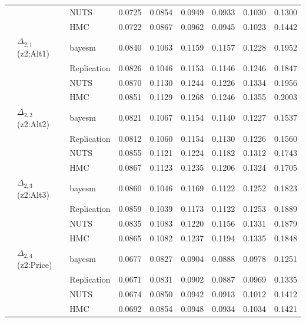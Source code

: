 \begin{longtable}{cllcccccc}
 &  & NUTS & 0.0725 & 0.0854 & 0.0949 & 0.0933 & 0.1030 & 0.1300 \\
 &  & HMC & 0.0722 & 0.0867 & 0.0962 & 0.0945 & 0.1023 & 0.1442 \\
 & $\Delta_{2,1}$ (z2:Alt1) & bayesm & 0.0840 & 0.1063 & 0.1159 & 0.1157 & 0.1228 & 0.1952 \\
 &  & Replication & 0.0826 & 0.1046 & 0.1153 & 0.1146 & 0.1246 & 0.1847 \\
 &  & NUTS & 0.0870 & 0.1130 & 0.1244 & 0.1226 & 0.1334 & 0.1956 \\
 &  & HMC & 0.0851 & 0.1129 & 0.1268 & 0.1246 & 0.1355 & 0.2003 \\
 & $\Delta_{2,2}$ (z2:Alt2) & bayesm & 0.0821 & 0.1067 & 0.1154 & 0.1140 & 0.1227 & 0.1537 \\
 &  & Replication & 0.0812 & 0.1060 & 0.1154 & 0.1130 & 0.1226 & 0.1560 \\
 &  & NUTS & 0.0855 & 0.1121 & 0.1224 & 0.1182 & 0.1312 & 0.1743 \\
 &  & HMC & 0.0867 & 0.1123 & 0.1235 & 0.1206 & 0.1324 & 0.1705 \\
 & $\Delta_{2,3}$ (z2:Alt3) & bayesm & 0.0860 & 0.1046 & 0.1169 & 0.1122 & 0.1252 & 0.1823 \\
 &  & Replication & 0.0859 & 0.1039 & 0.1173 & 0.1122 & 0.1253 & 0.1889 \\
 &  & NUTS & 0.0835 & 0.1083 & 0.1220 & 0.1156 & 0.1331 & 0.1879 \\
 &  & HMC & 0.0865 & 0.1082 & 0.1237 & 0.1194 & 0.1335 & 0.1848 \\
 & $\Delta_{2,4}$ (z2:Price) & bayesm & 0.0677 & 0.0827 & 0.0904 & 0.0888 & 0.0978 & 0.1251 \\
 &  & Replication & 0.0671 & 0.0831 & 0.0902 & 0.0887 & 0.0969 & 0.1335 \\
 &  & NUTS & 0.0674 & 0.0850 & 0.0942 & 0.0913 & 0.1012 & 0.1412 \\
 &  & HMC & 0.0692 & 0.0854 & 0.0948 & 0.0934 & 0.1034 & 0.1421 \\
\end{longtable}
